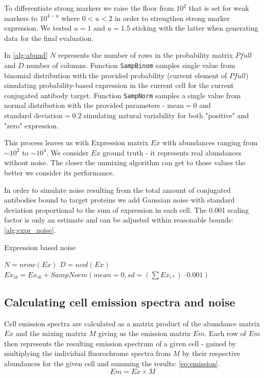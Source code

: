   To differentiate strong markers we raise the floor from $10^2$ that is set for weak markers to $10^{4-u}$ where $0<u<2$ in order to strengthen strong marker expression. We tested $u=1$ and $u=1.5$ sticking with the latter when generating data for the final evaluation. 
  
  In \cref{alg:abund} $N$ represents the number of rows in the probability matrix $Pfull$ and $D$ number of columns. Function \texttt{SampBinom} samples single value from binomial distribution with the provided probability (current element of $Pfull$) simulating probability-based expression in the current cell for the current conjugated antibody target. Function \texttt{SampNorm} samples a single value from normal distribution with the provided parameters - $\text{mean}=0$ and $\text{standard deviation}=0.2$ simulating natural variability for both "positive" and "zero" expression. 
  
  This process leaves us with Expression matrix $Ex$ with abundances ranging from $\sim 10^2$ to $\sim 10^4$. We consider $Ex$ ground truth - it represents real abundances without noise. The closer the unmixing algorithm can get to those values the better we consider its performance. 
  
  In order to simulate noise resulting from the total amount of conjugated antibodies bound to target proteins we add Gaussian noise with standard deviation proportional to the sum of expression in each cell. The 0.001 scaling factor is only an estimate and can be adjusted within reasonable bounds: \cref{alg:expr_noise}.
  
  \begin{algorithm}
  \caption{Expression based noise}\label{alg:expr_noise}
  \begin{algorithmic}
  \State $N = nrow(Ex)$
  \State $D = ncol(Ex)$
  \State $Ex_{ik}=Ex_{ik}+SampNorm(mean=0,sd=(\sum{Ex_{i*}})\cdot 0.001)$
  \EndFor 
  \EndFor 
  \end{algorithmic}
  \end{algorithm}
 
\subsection{Calculating cell emission spectra and noise}
Cell emission spectra are calculated as a matrix product of the abundance matrix $Ex$ and the mixing matrix $M$ giving us the emission matrix $Em$. Each row of $Em$ then represents the resulting emission spectrum of a given cell - gained by multiplying the individual fluorochrome spectra from $M$ by their respective abundances for the given cell and summing the results: \cref{eq:emission}.
\begin{equation}
 Em = Ex \times M 
 \label{eq:emission}
\end{equation}

